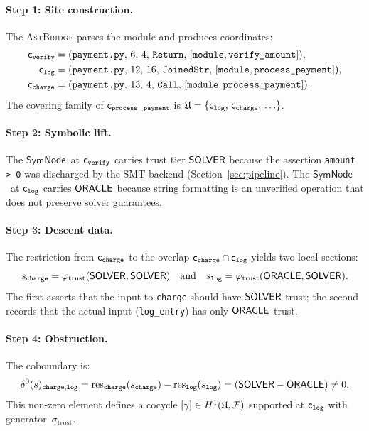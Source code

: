 \documentclass[11pt]{article}
\newcommand{\SymNode}{\ensuremath{\mathsf{SymNode}}}           %
\newcommand{\bugtrust}{\sigma_{\mathrm{trust}}}   %
\begin{document}
\paragraph{Step 1: Site construction.}
The \textsc{AstBridge} parses the module and produces coordinates:
\begin{align*}
  \mathsf{c}_{\mathtt{verify}} &= (\texttt{payment.py},\,6,\,4,\,\texttt{Return},\,
    [\texttt{module},\texttt{verify\_amount}]),\\
  \mathsf{c}_{\mathtt{log}}    &= (\texttt{payment.py},\,12,\,16,\,\texttt{JoinedStr},\,
    [\texttt{module},\texttt{process\_payment}]),\\
  \mathsf{c}_{\mathtt{charge}} &= (\texttt{payment.py},\,13,\,4,\,\texttt{Call},\,
    [\texttt{module},\texttt{process\_payment}]).
\end{align*}
The covering family of $\mathsf{c}_{\mathtt{process\_payment}}$ is
$\mathfrak{U} = \{\mathsf{c}_{\mathtt{log}},\, \mathsf{c}_{\mathtt{charge}},\,\ldots\}$.

\paragraph{Step 2: Symbolic lift.}
The \SymNode\ at $\mathsf{c}_{\mathtt{verify}}$ carries trust tier
$\mathsf{SOLVER}$ because the assertion \texttt{amount > 0} was discharged
by the SMT backend (Section~\ref{sec:pipeline}).  The \SymNode\ at
$\mathsf{c}_{\mathtt{log}}$ carries $\mathsf{ORACLE}$ because string formatting
is an unverified operation that does not preserve solver guarantees.

\paragraph{Step 3: Descent data.}
The restriction from $\mathsf{c}_{\mathtt{charge}}$ to the overlap
$\mathsf{c}_{\mathtt{charge}} \cap \mathsf{c}_{\mathtt{log}}$ yields two
local sections:
\[
  s_{\mathtt{charge}} = \varphi_{\mathrm{trust}}(\mathsf{SOLVER}, \mathsf{SOLVER})
  \quad\text{and}\quad
  s_{\mathtt{log}} = \varphi_{\mathrm{trust}}(\mathsf{ORACLE}, \mathsf{SOLVER}).
\]
The first asserts that the input to \texttt{charge} should have
$\mathsf{SOLVER}$ trust; the second records that the actual input
(\texttt{log\_entry}) has only $\mathsf{ORACLE}$ trust.

\paragraph{Step 4: Obstruction.}
The coboundary is:
\[
  \delta^0(s)_{\mathtt{charge},\mathtt{log}}
    = \mathrm{res}_{\mathtt{charge}}(s_{\mathtt{charge}}) - \mathrm{res}_{\mathtt{log}}(s_{\mathtt{log}})
    = (\mathsf{SOLVER} - \mathsf{ORACLE})
    \neq 0.
\]
This non-zero element defines a cocycle
$[\gamma] \in H^{1}(\mathfrak{U},\mathcal{F})$ supported at
$\mathsf{c}_{\mathtt{log}}$ with generator~$\bugtrust$.
\end{document}
